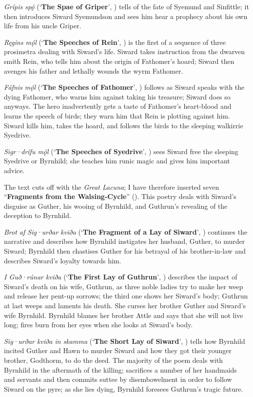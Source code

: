 \emph{Grípis spǫ́} (‘\textbf{The Spae of Griper}’, ) tells of the fate of Syemund and Sinfittle; it then introduces Siward Syemundson and sees him hear a prophecy about his own life from his uncle Griper.

\emph{Ręgins mǫ́l} (‘\textbf{The Speeches of Rein}’, ) is the first of a sequence of three prosimetra dealing with Siward’s life.  Siward takes instruction from the dwarven smith Rein, who tells him about the origin of Fathomer’s hoard; Siward then avenges his father and lethally wounds the wyrm Fathomer.

\emph{Fáfnis mǫ́l} (‘\textbf{The Speeches of Fathomer}’, ) follows as Siward speaks with the dying Fathomer, who warns him against taking his treasure; Siward does so anyways.  The hero inadvertently gets a taste of Fathomer’s heart-blood and learns the speech of birds; they warn him that Rein is plotting against him.  Siward kills him, takes the hoard, and follows the birds to the sleeping walkirrie Syedrive.

\emph{Sigr·drífu mǫ́l} (‘\textbf{The Speeches of Syedrive}’, ) sees Siward free the sleeping Syedrive or Byrnhild; she teaches him runic magic and gives him important advice.

The text cuts off with the \emph{Great Lacuna}; I have therefore inserted seven “\textbf{Fragments from the Walsing-Cycle}” ().  This poetry deals with Siward’s disguise as Guther, his wooing of Byrnhild, and Guthrun’s revealing of the deception to Byrnhild.

\emph{Brot af Sig·urðar kviða} (‘\textbf{The Fragment of a Lay of Siward}’, ) continues the narrative and describes how Byrnhild instigates her husband, Guther, to murder Siward; Byrnhild then chastises Guther for his betrayal of his brother-in-law and describes Siward’s loyalty towards him.

\emph{I Guð·rúnar kviða} (‘\textbf{The First Lay of Guthrun}’, ) describes the impact of Siward’s death on his wife, Guthrun, as three noble ladies try to make her weep and release her pent-up sorrows; the third one shows her Siward’s body; Guthrun at last weeps and laments his death.  She curses her brother Guther and Siward’s wife Byrnhild.  Byrnhild blames her brother Attle and says that she will not live long; fires burn from her eyes when she looks at Siward’s body.

\emph{Sig·urðar kviða in skamma} (‘\textbf{The Short Lay of Siward}’, ) tells how Byrnhild incited Guther and Hawn to murder Siward and how they got their younger brother, Godthorm, to do the deed.  The majority of the poem deals with Byrnhild in the aftermath of the killing; sacrifices a number of her handmaids and servants and then commits suttee by disembowelment in order to follow Siward on the pyre; as she lies dying, Byrnhild foresees Guthrun’s tragic future.

